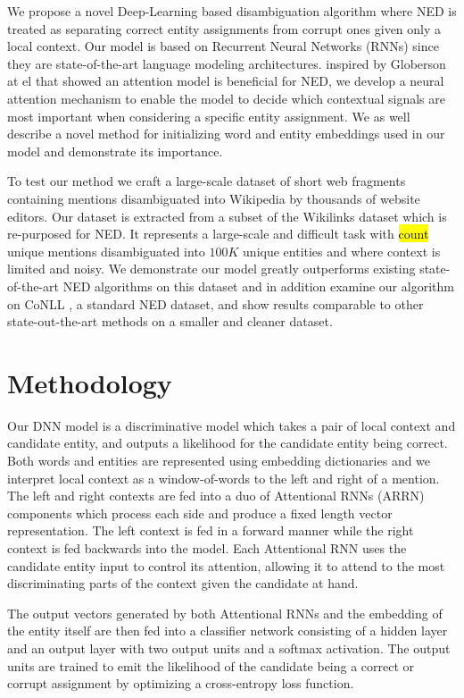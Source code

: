 \documentclass[11pt]{article}
\begin{document}
	We propose a novel Deep-Learning based disambiguation algorithm where NED is treated as separating correct entity assignments from corrupt ones given only a local context. Our model is based on Recurrent Neural Networks (RNNs) since they are state-of-the-art language modeling architectures. inspired by Globerson at el \cite{Globerson2016} that showed an attention model is beneficial for NED, we develop a neural attention mechanism to enable the model to decide which contextual signals are most important when considering a specific entity assignment. We as well describe a novel method for initializing word and entity embeddings used in our model and demonstrate its importance.
	
	To test our method we craft a large-scale dataset of short web fragments containing mentions disambiguated into Wikipedia by thousands of website editors. Our dataset is extracted from a subset of the Wikilinks dataset \cite{singh12:wiki-links} which is re-purposed for NED. It represents a large-scale and difficult task with \hl{count} unique mentions disambiguated into $100K$ unique entities and where context is limited and noisy. We demonstrate our model greatly outperforms existing state-of-the-art NED algorithms on this dataset and in addition examine our algorithm on CoNLL \cite{hoffart2011robust}, a standard NED dataset, and show results comparable to other state-out-the-art methods on a smaller and cleaner dataset.
	
	\section{Methodology}

	Our DNN model is a discriminative model which takes a pair of local context and candidate entity, and outputs a likelihood for the candidate entity being correct. Both words and entities are represented using embedding dictionaries and we interpret local context as a window-of-words to the left and right of a mention. The left and right contexts are fed into a duo of Attentional RNNs (ARRN) components which process each side and produce a fixed length vector representation. The left context is fed in a forward manner while the right context is fed backwards into the model. Each Attentional RNN uses the candidate entity input to control its attention, allowing it to attend to the most discriminating parts of the context given the candidate at hand. 
	
	The output vectors generated by both Attentional RNNs and the embedding of the entity itself are then fed into a classifier network consisting of a hidden layer and an output layer with two output units and a softmax activation. The output units are trained to emit the likelihood of the candidate being a correct or corrupt assignment by optimizing a cross-entropy loss function. 
	
\end{document}
